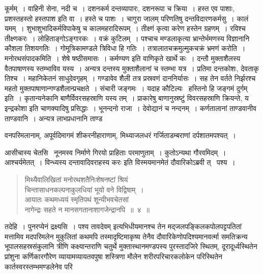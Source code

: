 \documentclass[11pt, openany]{book}
\begin{document}
\noindent
{\s कूर्मम्~। वाहिनी सेना, नदी च~। दशनकर्म दन्तव्यापारः, दशनरूपा च क्रिया~। हस्त एव पाशाः, प्रशस्तहस्तो हस्तपाश इति वा~। हस्ते च पाशः~। चागुरा जालम् परिणतिषु दन्तविदारणकर्मसु~। कालं यमम्~। शुभाशुभादिकर्मविपाकेषु च कालमहरादिरूपम्~। तीक्ष्णं कृत्वा करेण हस्तेन ग्रहणम्~। रविश्च तीक्ष्णकरः~। लोहिताङ्गोऽङ्गारकः~। वक्रं कुटिलम्~। पश्चाच मण्डलाकृत्या भ्रान्तेर्भमणस्य विज्ञानानि कौशला तिशयगतिः~। गोमूत्रिकामण्डले त्रिविधा हि गतिः~। तत्रालातचक्रमुल्मुकचक्रं भ्रमणं करोति~। {\qtt मनोरथसंपादकमिति}~। शेषे षष्ठीसमासः~। {\qt कर्मण्यण} इति वाणिकृते खार्थे कः~। दन्तौ मुक्ताशैलस्य वैतपाषाणस्य स्तम्भाविव यस्य~। अन्यत्र दन्तस्य मुक्ताशैलानां च स्तम्भा यत्र~। प्रतिमा दन्तकोशः, देवताकृ तिश्च~। महानिकेतनं साधुदेवगृहम्~। गण्डावेव शैली तत्र प्रस्रवणं दाननिर्यासः~। सह तेन वर्तते निर्झरश्च {\qt महतो मुक्तपाषाणान्गण्डशैलान्प्रचक्षते}~। संचारी जङ्गमः~। यदाह कौटिल्यः \textendash\ {\qt हस्तिनो हि जङ्गमं दुर्गम्} इति~। कृतान्यनेकानि बाणैर्विवरसहस्राणि यस्य तम्~। प्राकारेषु बाणानुस्रष्टुं विवरसहस्राणि क्रियन्ते, य इन्द्रकोशा इति चाणक्यादिषु प्रसिद्धाः~। भूनन्दनो राजा~। {\qt देवोद्यानं च नन्दनम्}~। कर्णतालानां ताण्डवानीव ताण्डवानि~। अन्यत्र लाभप्रधानानि ताण्ड\textendash}

\newpage

\noindent
वनपरिमलानाम्, अपूर्वदिमागमं शीकरनीहाराणाम्, मिथ्याजलधरं गर्जिताडम्बराणां दर्पशातमपश्यत्~।

आसीचास्य चेतसि \textendash\ {\haq नूनमस्व निर्माणे गिरयो प्राहिताः परमाणुताम्~। कुतोऽन्यथा गौरवमिदम्~। आश्चर्यमेतत्~। विन्ध्यस्य दन्तावादिवराहस्य करः} इति विस्मयमानमेतं दौवारिकोऽब्रवी त् \textendash\ पश्य~।

\vspace{-5mm}
\begin{quote}
{\ha मिथ्यैवालिखितां मनोरथशतैनिःशेषनष्टां श्रियं\\
चिन्तासाधनकल्पनाकुलधियां भूयो वने विद्विषाम्~।\\
आयातः कथमध्ययं स्मृतिपथं शून्यीभवचेतसां\\
नागेन्द्रः सहते न मानसगतानाशागजेन्द्रानपि~॥~४~॥}
\end{quote}

\vspace{-5mm}
तदेहि~। पुनरप्येनं द्रक्ष्यसि~। पश्य तावदेवम् इत्यभिधीयमानश्च तेन मद्जलपङ्किलकपोलपट्टपतितां मत्तामिव मदपरिमलेन मुकुलितां कथमपि तस्मादृष्टिमाकृष्य तेनैव दौवारिकेणोपदिश्यमानवर्त्मा समतिक्रन्य भूपालसहस्रसंकुलानि त्रीणि कक्ष्यान्तराणि चतुर्थे मुक्तास्थानमण्डपस्य पुरस्तादजिरे स्थितम्, दूरादूर्ध्वस्थितेन प्रांशुना कर्णिकारगौरेण व्यायामव्यायतवपुषा शस्त्रिणा मौलेन शरीरपरिचारकलोकेन परिस्थितेन कार्तस्वरस्तम्भमण्डलेनेव परि\textendash
\end{document}
